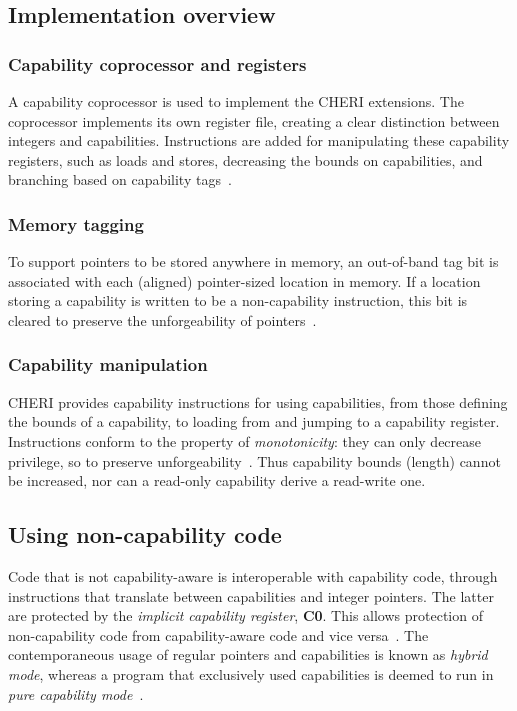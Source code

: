 \documentclass[dissertation.tex]{subfiles}
\begin{document}
\subsection{Implementation overview}

\subsubsection{Capability coprocessor and registers}
A capability coprocessor is used to implement the CHERI extensions.
The coprocessor implements its own register file, creating a clear
distinction between integers and capabilities.
Instructions are added for manipulating these capability registers, such
as loads and stores, decreasing the bounds on capabilities, and
branching based on capability tags~\cite{cheri-risc-2014}.

\subsubsection{Memory tagging}
To support pointers to be stored anywhere in memory, an out-of-band tag
bit is associated with each (aligned) pointer-sized location in memory.
If a location storing a capability is written to be a non-capability
instruction, this bit is cleared to preserve the unforgeability of
pointers~\cite{cheri-risc-2014}.

\subsubsection{Capability manipulation}
CHERI provides capability instructions for using capabilities, from
those defining the bounds of a capability, to loading from and jumping
to a capability register.
Instructions conform to the property of \emph{monotonicity}: they can
only decrease privilege, so to preserve
unforgeability~\cite{cheri-risc-2014}.
Thus capability bounds (length) cannot be increased, nor can a read-only
capability derive a read-write one.


\subsection{Using non-capability code}
Code that is not capability-aware is interoperable with capability code,
through instructions that translate between capabilities and integer
pointers.
The latter are protected by the \emph{implicit capability register},
\textbf{C0}.
This allows protection of non-capability code from capability-aware code
and vice versa~\cite{cheri-risc-2014}.
The contemporaneous usage of regular pointers and capabilities is known
as \emph{hybrid mode}, whereas a program that exclusively used
capabilities is deemed to run in \emph{pure capability
mode}~\cite{cheri-prog-guide}.
\end{document}
